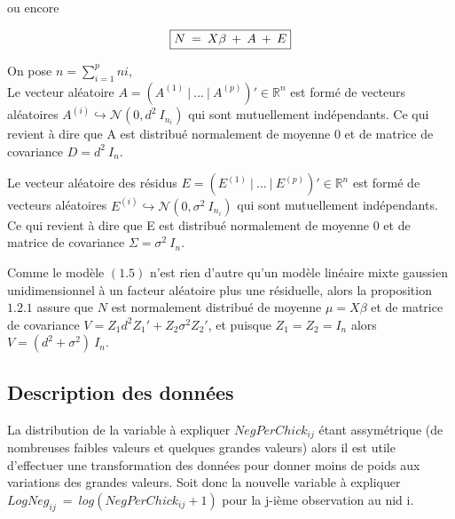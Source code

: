 \documentclass[11pt,fleqn]{book} %
\begin{document}
	\vspace{1em}
	
	ou encore
	
	\begin{equation}
		\fbox{$
			N\:=\:X\beta\:+\:A\:+\:E
			$}
	\end{equation}
	
	\vspace{1em}
	
	On pose $n=\sum_{i=1}^{p} ni$,\\ 
	
	Le vecteur aléatoire $A=\left(A^{(1)}\:|\:...\:|\:A^{(p)}\right)'\in \mathbb{R}^{n}$ est formé de vecteurs aléatoires $A^{(i)}\hookrightarrow\mathcal{N}(0,d^2\:I_{n_i})$ qui sont mutuellement indépendants. Ce qui revient à dire que A est distribué normalement de moyenne $0$ et de matrice de covariance $D=d^2\:I_n$.  
	
	\vspace{1em}
	
	Le vecteur aléatoire des résidus $E=\left(E^{(1)}\:|\:...\:|\:E^{(p)}\right)'\in \mathbb{R}^{n}$ est formé de vecteurs aléatoires $E^{(i)}\hookrightarrow\mathcal{N}(0,\sigma^2\:I_{n_i})$ qui sont mutuellement indépendants. Ce qui revient à dire que E est distribué normalement de moyenne $0$ et de matrice de covariance $\Sigma=\sigma^2\:I_n$.  
	
	\vspace{1em}
	
	Comme le modèle $(1.5)$ n'est rien d'autre qu'un modèle linéaire mixte gaussien unidimensionnel à un facteur aléatoire plus une résiduelle, alors la proposition $1.2.1$ assure que $N$ est normalement distribué de moyenne $\mu=X\beta$ et de matrice de covariance $V= Z_1 d^2 Z_1' + Z_2 \sigma^2 Z_2'$, et puisque $Z_1=Z_2=I_n $ \: alors \: $ V=(d^2 + \sigma^2) \:I_n$.
	
	\newpage 
	
	\subsection{Description des données} 
	
	\vspace{1em}
	
	La distribution de la variable à expliquer $NegPerChick_{ij}$ étant assymétrique (de nombreuses faibles valeurs et quelques grandes valeurs) alors il est utile d'effectuer une transformation des données pour donner moins de poids aux variations des grandes valeurs. 
	Soit donc la nouvelle variable à expliquer $LogNeg_{ij}\:=\:log(NegPerChick_{ij}+1)$ pour la j-ième observation au nid i.
	\vspace{2em}
	
\end{document}
